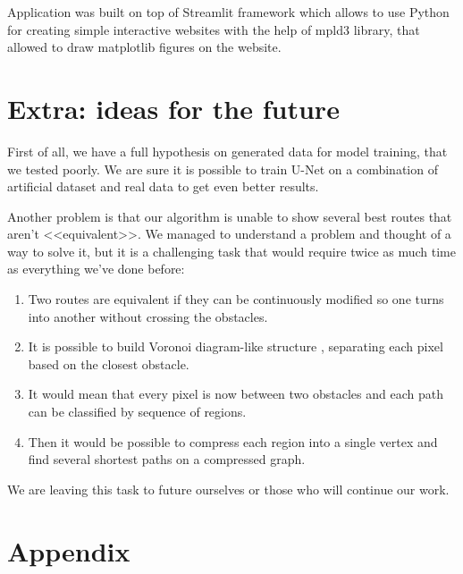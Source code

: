 \documentclass[a4paper,12pt]{extarticle}
\begin{document}
Application was built on top of Streamlit \cite{streamlit} framework which allows to use Python for creating simple interactive websites with the help of mpld3 \cite{mpld3} library, that allowed to draw matplotlib figures on the website.

\section{Extra: ideas for the future}

First of all, we have a full hypothesis on generated data for model training, that we tested poorly.
We are sure it is possible to train U-Net on a combination of artificial dataset and real data to get even better results.

Another problem is that our algorithm is unable to show several best routes that aren’t <<equivalent>>.
We managed to understand a problem and thought of a way to solve it, but it is a challenging task that would require twice as much time as everything we've done before:
\begin{enumerate}
    \item Two routes are equivalent if they can be continuously modified so one turns into another without crossing the obstacles.
    \item It is possible to build Voronoi diagram-like structure \cite{voronoipolygon}, separating each pixel based on the closest obstacle.
    \item It would mean that every pixel is now between two obstacles and each path can be classified by sequence of regions.
    \item Then it would be possible to compress each region into a single vertex and find several shortest paths on a compressed graph.
\end{enumerate}

We are leaving this task to future ourselves or those who will continue our work.






\newpage
\section{Appendix}
\end{document}
